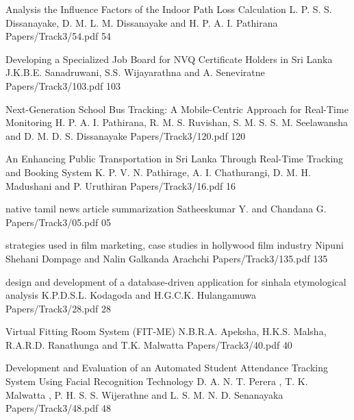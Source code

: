 



  \addpaper
    	{Analysis the Influence Factors of the Indoor Path Loss Calculation}
   		 {L. P. S. S. Dissanayake, D. M. L. M. Dissanayake and H. P. A. I. Pathirana} 
   		 {Papers/Track3/54.pdf}
        {54}


    \addpaper
    	{Developing a Specialized Job Board for NVQ Certificate Holders in Sri Lanka}
   		 {J.K.B.E. Sanadruwani, S.S. Wijayarathna and A. Seneviratne} 
   		 {Papers/Track3/103.pdf}
        {103}

    
 \addpaper
    	{Next-Generation School Bus Tracking: A Mobile-Centric Approach for Real-Time Monitoring}
   		 {H. P. A. I. Pathirana, R. M. S. Ruvishan, S. M. S. S. M. Seelawansha and D. M. D. S. Dissanayake} 
   		 {Papers/Track3/120.pdf}
        {120}




   \addpaper
    	{An Enhancing Public Transportation in Sri Lanka Through Real-Time Tracking and Booking System}
   		 {K. P. V. N. Pathirage, A. I. Chathurangi, D. M. H. Madushani and P. Uruthiran} 
   		 {Papers/Track3/16.pdf}
        {16}

  
  \addpaper
    	{native tamil news article summarization}
   		 {Satheeskumar Y. and Chandana G.} 
   		 {Papers/Track3/05.pdf}
        {05}

  \addpaper
    	{strategies used in film marketing, case studies in hollywood film industry}
   		 {Nipuni Shehani Dompage and Nalin Galkanda Arachchi} 
   		 {Papers/Track3/135.pdf}
        {135}


      \addpaper
    	{design and development of a database-driven application for sinhala etymological analysis}
   		 {K.P.D.S.L. Kodagoda and H.G.C.K. Hulangamuwa} 
   		 {Papers/Track3/28.pdf}
        {28}



    \addpaper
    	{Virtual Fitting Room System (FIT-ME)}
   		 {N.B.R.A. Apeksha, H.K.S. Malsha, R.A.R.D. Ranathunga and T.K. Malwatta} 
   		 {Papers/Track3/40.pdf}
        {40}

    \addpaper
    	{Development and Evaluation of an Automated Student Attendance Tracking System Using Facial Recognition Technology}
   		 {D. A. N. T. Perera , T. K. Malwatta , P. H. S. S. Wijerathne and L. S. M. N. D. Senanayaka} 
   		 {Papers/Track3/48.pdf}
        {48}


        


        

   

   

   


  
  